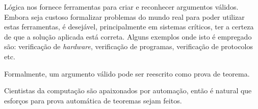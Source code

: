 
Lógica nos fornece ferramentas para criar e reconhecer argumentos válidos. Embora seja custoso %
formalizar problemas do mundo real para poder utilizar estas ferramentas, é desejável, principalmente em sistemas críticos, ter a certeza de que a solução aplicada está correta. Alguns exemplos onde isto é empregado são: verificação de \textit{hardware}, verificação de programas, verificação de protocolos etc. %

Formalmente, um argumento válido pode ser reescrito como prova de teorema.

Cientistas da computação são apaixonados por automação, %
então é natural que esforços para prova automática de teoremas sejam feitos. %

